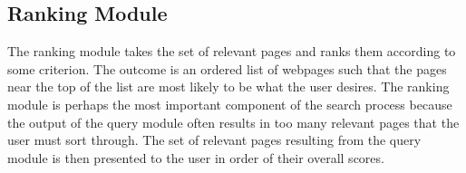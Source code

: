 \subsection{Ranking Module}
The ranking module takes the set of relevant pages and ranks them according to some criterion. The outcome is an ordered list of webpages such that the pages near the top of the list are most likely to be what the user desires. The ranking module is perhaps the most important component of the search process because the output of the query module often results in too many relevant pages that the user must sort through. The set of relevant pages resulting from the query module is then presented to the user in order of their overall scores.